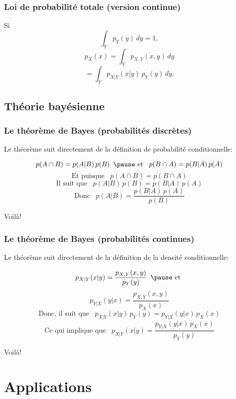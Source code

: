 \documentclass{beamer}
\begin{document}
\begin{frame}
    \frametitle{Loi de probabilité totale (version continue)}
    Si
    \[\int_Y p_Y(y) \, dy = 1,\]
    \pause
    \[p_X(x) = \int_{Y} p_{X,Y}(x, y) \, dy\]
    \pause
    \[= \int_{Y} p_{X|Y}(x | y) \, p_Y(y) \, dy.\]
\end{frame}



\subsection{Théorie bayésienne}

\begin{frame}
    \frametitle{Le théorème de Bayes (probabilités discrètes)}
    Le théorème suit directement de la définition de probabilité conditionnelle:

    \pause

    \[p(A \cap B) =  p(A | B) \, p(B) \,\,\, \pause \textrm{ et } \,\,\, p(B \cap A) =  p(B | A) \, p(A)\]
    \pause
    \[\textrm{Et puisque } \,\,\, p(A \cap B) = p(B \cap A)\]
    \pause
    \[\textrm{Il suit que } \,\,\, p(A | B) \, p(B) = p(B | A) \, p(A)\]
    \pause
    \[\textrm{Donc } \,\,\, p(A | B) = \frac{p(B | A) \, p(A)}{p(B)}\]
    
    Voilà!
\end{frame}


\begin{frame}
    \frametitle{Le théorème de Bayes (probabilités continues)}
    Le théorème suit directement de la définition de la densité conditionnelle:

    \pause

    \[p_{X|Y}(x|y) = \frac{p_{X,Y}(x,y)}{p_Y(y)} \,\,\, \pause \textrm{ et }\]
    \[p_{Y|X}(y|x) = \frac{p_{X,Y}(x,y)}{p_X(x)}\]
    \pause
    \[\textrm{Donc, il suit que } \,\,\, p_{X|Y}(x|y) \, p_Y(y) = p_{Y|X}(y|x) \, p_X(x)\]
    \pause
    \[\textrm{Ce qui implique que } \,\,\, p_{X|Y}(x|y) = \frac{p_{Y|X}(y|x) \, p_X(x)}{p_Y(y)}\]

    Voilà!
\end{frame}



\section{Applications}
\end{document}
